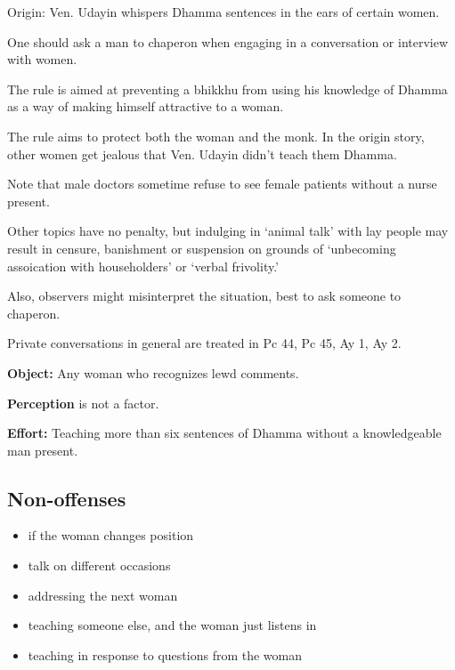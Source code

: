 \begin{multicols}{2}

Origin: Ven. Udayin whispers Dhamma sentences in the ears of certain
women.

One should ask a man to chaperon when engaging in a conversation or
interview with women.

The rule is aimed at preventing a bhikkhu from using his knowledge of
Dhamma as a way of making himself attractive to a woman.

The rule aims to protect both the woman and the monk. In the origin
story, other women get jealous that Ven. Udayin didn't teach them
Dhamma.

Note that male doctors sometime refuse to see female patients without a
nurse present.

Other topics have no penalty, but indulging in `animal talk' with lay
people may result in censure, banishment or suspension on grounds of
`unbecoming assoication with householders' or `verbal frivolity.'

Also, observers might misinterpret the situation, best to ask someone to
chaperon.

Private conversations in general are treated in Pc 44, Pc 45, Ay 1, Ay
2.

\columnbreak

\textbf{Object:} Any woman who recognizes lewd comments.

\textbf{Perception} is not a factor.

\textbf{Effort:} Teaching more than six sentences of Dhamma without a
knowledgeable man present.

\subsection{Non-offenses}

\begin{itemize}
\tightlist
\item
  if the woman changes position
\item
  talk on different occasions
\item
  addressing the next woman
\item
  teaching someone else, and the woman just listens in
\item
  teaching in response to questions from the woman
\end{itemize}

\end{multicols}

